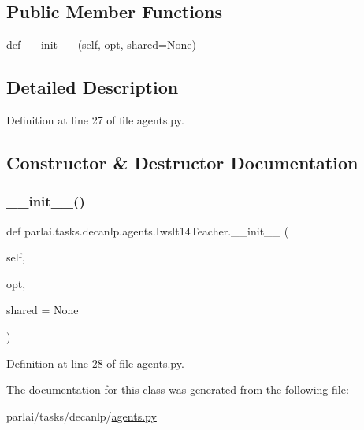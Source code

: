 \subsection*{Public Member Functions}
\begin{DoxyCompactItemize}
\item 
def \hyperlink{classparlai_1_1tasks_1_1decanlp_1_1agents_1_1Iwslt14Teacher_ab5be25b3d68b4bbaa180c280c67a7946}{\+\_\+\+\_\+init\+\_\+\+\_\+} (self, opt, shared=None)
\end{DoxyCompactItemize}


\subsection{Detailed Description}


Definition at line 27 of file agents.\+py.



\subsection{Constructor \& Destructor Documentation}
\mbox{\label{classparlai_1_1tasks_1_1decanlp_1_1agents_1_1Iwslt14Teacher_ab5be25b3d68b4bbaa180c280c67a7946}} 
\subsubsection{\texorpdfstring{\+\_\+\+\_\+init\+\_\+\+\_\+()}{\_\_init\_\_()}}
{\footnotesize\ttfamily def parlai.\+tasks.\+decanlp.\+agents.\+Iwslt14\+Teacher.\+\_\+\+\_\+init\+\_\+\+\_\+ (\begin{DoxyParamCaption}\item[{}]{self,  }\item[{}]{opt,  }\item[{}]{shared = {\ttfamily None} }\end{DoxyParamCaption})}



Definition at line 28 of file agents.\+py.



The documentation for this class was generated from the following file\+:\begin{DoxyCompactItemize}
\item 
parlai/tasks/decanlp/\hyperlink{parlai_2tasks_2decanlp_2agents_8py}{agents.\+py}\end{DoxyCompactItemize}
